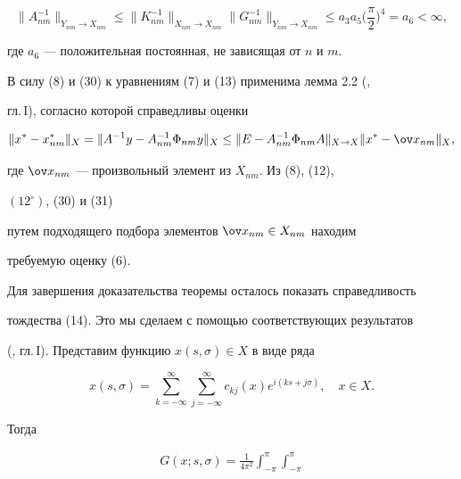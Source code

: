 \begin{pf}
\begin{equation}
\|A^{-1}_{nm}\|_{Y_{nm}\to X_{nm}}\le \|K^{-1}_{nm} 


\|_{X_{nm}\to X_{nm}}\|G^{-1}_{nm}\|_{Y_{nm}\to X_{nm}}\le 


a_3a_5\bigg(\frac{\pi}{2} \bigg)^4=a_6<\infty, 


\end{equation} 


где $a_6$ --- положительная постоянная, не зависящая от $n$ и $m$. 


 


В силу (8) и (30) к уравнениям (7) и (13) применима лемма 2.2 (\cite{4}, 


гл.\,I), согласно которой справедливы оценки 


\begin{equation} 


\|x^*-x^*_{nm}\|_X=\|A^{-1}y-A^{-1}_{nm}\Phi_{nm}y\|_X\le 


\|E-A^{-1}_{nm}\Phi_{nm}A\|_{X\to X} 


\|x^*-\ov x_{nm}\|_X, 


\end{equation} 


где $\ov x_{nm}$ --- произвольный элемент из $X_{nm}$. Из (8), (12), 


$(12^\circ)$, (30) и (31) 


путем подходящего подбора элементов $\ov x_{nm}\in X_{nm}$ находим 


требуемую оценку (6). 


 


Для завершения доказательства теоремы осталось показать справедливость 


тождества (14). Это мы сделаем с помощью соответствующих результатов 


(\cite{7}, гл.\,I). Представим функцию $x(s,\sigma)\in X$ в виде ряда 


\begin{equation} 


x(s,\sigma)=\sum^\infty_{k=-\infty}\sum^\infty_{j=-\infty} 


c_{k j}(x)e^{i(k s+j\sigma)},\quad x\in X. 


\end{equation} 


Тогда 


\begin{multline} 


G(x;s,\sigma)=\frac{1}{4\pi^2}\int^\pi_{-\pi}\int^\pi_{-\pi} 



\end{multline}
\end{pf}
